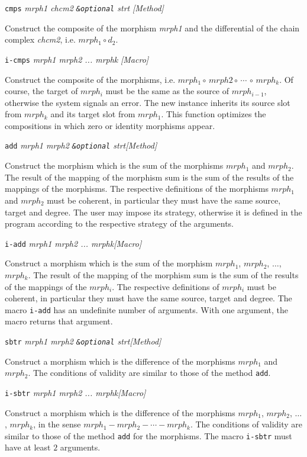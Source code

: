 \newpage
{\parindent=0mm
{\leftskip=5mm
{\tt cmps} {\em mrph1 chcm2 {\tt \&optional} strt} \hfill{\em [Method]}\par }
{\leftskip=15mm
Construct the composite of the morphism {\em mrph1} and the differential of the chain complex {\em chcm2},
i.e. $mrph_1 \circ d_2$. \par}
{\leftskip=5mm
{\tt i-cmps} {\em mrph1 mrph2 ... mrphk} \hfill{\em [Macro]}\par }
{\leftskip=15mm
Construct the  composite of the morphisms, i.e. $mrph_1 \circ\, mrph2 \circ\, \cdots\, \circ\, mrph_k$.
Of course, the target of $mrph_i$ must be the same as the source of $mrph_{i-1}$, otherwise the
system signals an error. The new instance  inherits
its source slot from $mrph_k$ and its target slot from $mrph_1$. This function optimizes
the compositions in which zero or identity morphisms appear. \par}
{\leftskip=5mm
{\tt add} {\em mrph1 mrph2 {\tt \&optional} strt}\hfill {\em [Method]}  \par }
{\leftskip=15mm
Construct the morphism which is the sum  of the  morphisms $mrph_1$ and  $mrph_2$.  The result of the mapping
of the morphism sum is the sum of the results of the mappings of the morphisms.
The respective definitions of the morphisms $mrph_1$ and  $mrph_2$  must be coherent,
in particular they must have the same  source, target and degree. The user may impose
its strategy, otherwise it is defined in the program according to the respective
strategy of the arguments.\par}
{\leftskip=5mm
{\tt i-add} {\em mrph1 mrph2 ... mrphk}\hfill {\em [Macro]}  \par }
{\leftskip=15mm
Construct a morphism which is the sum  of the  morphism $mrph_1$,  $mrph_2$, $\ldots$, $mrph_k$.  The result of the mapping
of the morphism sum is the sum of the results of the mappings of the $mrph_i$.
The respective definitions of $mrph_i$ must be coherent, in particular they must have the same
source, target and degree. The macro {\tt i-add} has an undefinite number of arguments.
With one argument, the macro returns that argument.\par}
{\leftskip=5mm
{\tt sbtr} {\em mrph1 mrph2 {\tt \&optional} strt}\hfill {\em [Method]}  \par }
{\leftskip=15mm
Construct a morphism which is the difference  of the  morphisms $mrph_1$ and  $mrph_2$. The conditions of validity are
similar to those of the method {\tt add}. \par}
{\leftskip=5mm
{\tt i-sbtr} {\em mrph1 mrph2 ... mrphk}\hfill {\em [Macro]}  \par }
{\leftskip=15mm
Construct a morphism which is the difference  of the  morphisms $mrph_1$,  $mrph_2$, $\ldots$, $mrph_k$, in the sense
$mrph_1 -  mrph_2 - \cdots - mrph_k$. The conditions of validity are similar to those of the method
{\tt add} for the morphisms. The macro {\tt i-sbtr} must have at least $2$ arguments.  \par}
}
